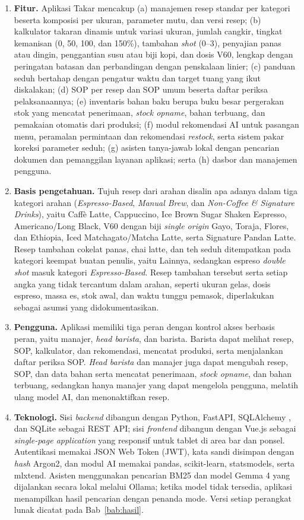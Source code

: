 \begin{enumerate}[label=\arabic*.]
\item \textbf{Fitur.} Aplikasi Takar mencakup (a) manajemen resep standar per kategori beserta komposisi per ukuran, parameter mutu, dan versi resep; (b) kalkulator takaran dinamis untuk variasi ukuran, jumlah cangkir, tingkat kemanisan (0, 50, 100, dan 150\%), tambahan \textit{shot} (0--3), penyajian panas atau dingin, penggantian susu atau biji kopi, dan dosis V60, lengkap dengan peringatan batasan dan perbandingan dengan penskalaan linier; (c) panduan seduh bertahap dengan pengatur waktu dan target tuang yang ikut diskalakan; (d) SOP per resep dan SOP umum beserta daftar periksa pelaksanaannya; (e) inventaris bahan baku berupa buku besar pergerakan stok yang mencatat penerimaan, \textit{stock opname}, bahan terbuang, dan pemakaian otomatis dari produksi; (f) modul rekomendasi AI untuk pasangan menu, peramalan permintaan dan rekomendasi \textit{restock}, serta sistem pakar koreksi parameter seduh; (g) asisten tanya-jawab lokal dengan pencarian dokumen dan pemanggilan layanan aplikasi; serta (h) dasbor dan manajemen pengguna.
\item \textbf{Basis pengetahuan.} Tujuh resep dari arahan disalin apa adanya dalam tiga kategori arahan (\textit{Espresso-Based}, \textit{Manual Brew}, dan \textit{Non-Coffee \& Signature Drinks}), yaitu Caffè Latte, Cappuccino, Ice Brown Sugar Shaken Espresso, Americano/Long Black, V60 dengan biji \textit{single origin} Gayo, Toraja, Flores, dan Ethiopia, Iced Matchagato/Matcha Latte, serta Signature Pandan Latte. Resep tambahan cokelat panas, chai latte, dan teh seduh ditempatkan pada kategori keempat buatan penulis, yaitu Lainnya, sedangkan espreso \textit{double shot} masuk kategori \textit{Espresso-Based}. Resep tambahan tersebut serta setiap angka yang tidak tercantum dalam arahan, seperti ukuran gelas, dosis espreso, massa es, stok awal, dan waktu tunggu pemasok, diperlakukan sebagai asumsi yang didokumentasikan.
\item \textbf{Pengguna.} Aplikasi memiliki tiga peran dengan kontrol akses berbasis peran, yaitu manajer, \textit{head barista}, dan barista. Barista dapat melihat resep, SOP, kalkulator, dan rekomendasi, mencatat produksi, serta menjalankan daftar periksa SOP. \textit{Head barista} dan manajer juga dapat mengubah resep, SOP, dan data bahan serta mencatat penerimaan, \textit{stock opname}, dan bahan terbuang, sedangkan hanya manajer yang dapat mengelola pengguna, melatih ulang model AI, dan menonaktifkan resep.
\item \textbf{Teknologi.} Sisi \textit{backend} dibangun dengan Python, FastAPI, SQLAlchemy \citep*{bayer2026sqlalchemy}, dan SQLite sebagai REST API; sisi \textit{frontend} dibangun dengan Vue.js sebagai \textit{single-page application} yang responsif untuk tablet di area bar dan ponsel. Autentikasi memakai JSON Web Token (JWT), kata sandi disimpan dengan \textit{hash} Argon2, dan modul AI memakai pandas, scikit-learn, statsmodels, serta mlxtend. Asisten menggunakan pencarian BM25 dan model Gemma 4 yang dijalankan secara lokal melalui Ollama; ketika model tidak tersedia, aplikasi menampilkan hasil pencarian dengan penanda mode. Versi setiap perangkat lunak dicatat pada Bab~\ref{bab:hasil}.

\end{enumerate}
